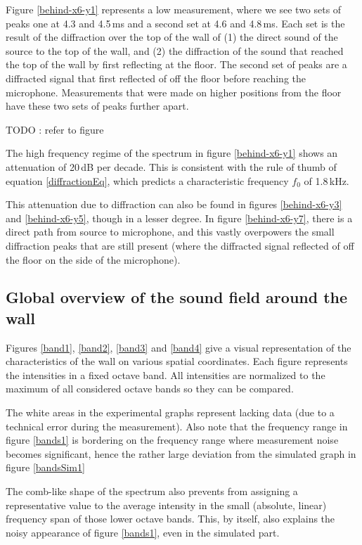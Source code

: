 Figure \ref{behind-x6-y1} represents a low measurement, where we see two sets of peaks one at 4.3 and 4.5\,ms and a second set at 4.6 and 4.8\,ms. Each set is the result of the diffraction over the top of the wall of (1) the direct sound of the source to the top of the wall, and (2) the diffraction of the sound that reached the top of the wall by first reflecting at the floor. The second set of peaks are a diffracted signal that first reflected of off the floor before reaching the microphone. Measurements that were made on higher positions from the floor have these two sets of peaks further apart.

TODO : refer to figure

The high frequency regime of the spectrum in figure \ref{behind-x6-y1} shows an attenuation of 20\,dB per decade. This is consistent with the rule of thumb of equation \ref{diffractionEq}, which predicts a characteristic frequency $f_0$ of 1.8\,kHz.

This attenuation due to diffraction can also be found in figures \ref{behind-x6-y3} and \ref{behind-x6-y5}, though in a lesser degree. In figure \ref{behind-x6-y7}, there is a direct path from source to microphone, and this vastly overpowers the small diffraction peaks that are still present (where the diffracted signal reflected of off the floor on the side of the microphone).



\subsection{Global overview of the sound field around the wall}
Figures \ref{band1}, \ref{band2}, \ref{band3} and \ref{band4} give a visual representation of the characteristics of the wall on various spatial coordinates. Each figure represents the intensities in a fixed octave band. All intensities are normalized to the maximum of all considered octave bands so they can be compared.

The white areas in the experimental graphs represent lacking data (due to a technical error during the measurement). Also note that the frequency range in figure \ref{bands1} is bordering on the frequency range where measurement noise becomes significant, hence the rather large deviation from the simulated graph in figure \ref{bandsSim1}

The comb-like shape of the spectrum also prevents from assigning a representative value to the average intensity in the small (absolute, linear) frequency span of those lower octave bands. This, by itself, also explains the noisy appearance of figure \ref{bands1}, even in the simulated part.

